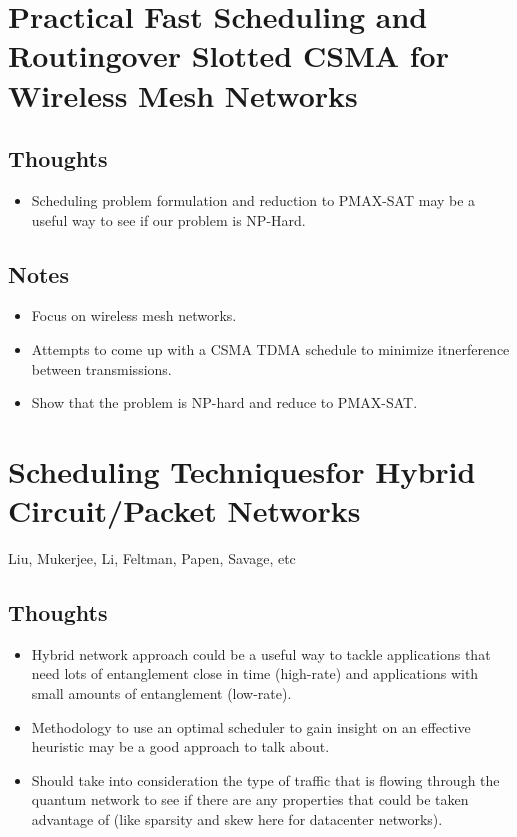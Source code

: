 \documentclass{article}
\begin{document}
\section{Practical Fast Scheduling and Routingover Slotted CSMA for Wireless Mesh Networks}

\subsection{Thoughts}
\begin{itemize}
    \item Scheduling problem formulation and reduction to PMAX-SAT may be a useful way to see if our problem is NP-Hard.
\end{itemize}

\subsection{Notes}
\begin{itemize}
    \item Focus on wireless mesh networks.
    \item Attempts to come up with a CSMA TDMA schedule to minimize itnerference between transmissions.
    \item Show that the problem is NP-hard and reduce to PMAX-SAT.
\end{itemize}


\section{Scheduling Techniquesfor Hybrid Circuit/Packet Networks}
Liu, Mukerjee, Li, Feltman, Papen, Savage, etc

\subsection{Thoughts}
\begin{itemize}
    \item Hybrid network approach could be a useful way to tackle applications that need lots of entanglement close in time (high-rate) and applications with small amounts of entanglement (low-rate).
    \item Methodology to use an optimal scheduler to gain insight on an effective heuristic may be a good approach to talk about.
    \item Should take into consideration the type of traffic that is flowing through the quantum network to see if there are any properties that could be taken advantage of (like sparsity and skew here for datacenter networks).
\end{itemize}
\end{document}
